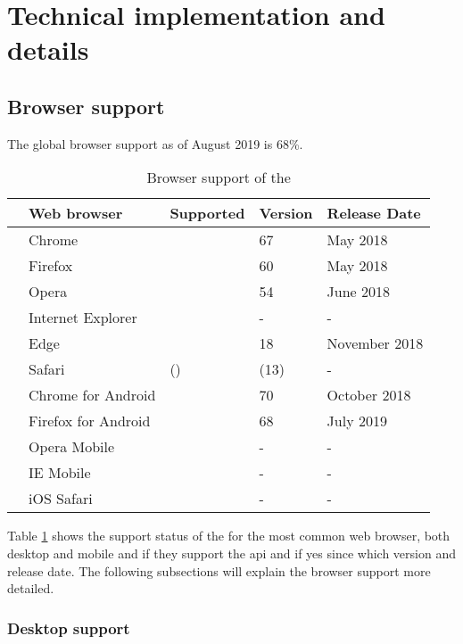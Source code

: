 \section{Technical implementation and details}

\subsection{Browser support}

The global browser support as of August 2019 is 68\%.
\begin{table}[ht]
\renewcommand\thetable{1}
\begin{tabularx}{\textwidth}{l|p{4cm}|p{2.5cm}|p{2cm}|p{3.5cm}}
	& Web browser & Supported & Version & Release Date \\
	\hline
	\parbox[t]{2mm}{} & Chrome & \OK & 67 & May 2018 \\
	& Firefox & \OK & 60 & May 2018 \\
	& Opera & \OK & 54 & June 2018 \\
	& Internet Explorer & \NOOK & - & - \\
	& Edge & \OK & 18 & November 2018 \\
	& Safari & (\OK) & (13) & - \\
	\hline
	\parbox[t]{2mm}{} & Chrome for Android & \OK & 70 & October 2018 \\
	& Firefox for Android & \OK & 68 & July 2019 \\
	& Opera Mobile & \NOOK & - & - \\
	& IE Mobile & \NOOK & - & - \\
	& iOS Safari & \NOOK & - & - \\
	\hline
\end{tabularx}
\caption[Browser support of the \wa{}]{Browser support of the \wa{}\footnotemark} \label{tab:browser-support}
\end{table}

Table \ref{tab:browser-support} shows the support status of the \wa{} for the most common web browser, both desktop and mobile and if they support the \gls{api} and if yes since which version and release date. The following subsections will explain the browser support more detailed.

\subsubsection{Desktop support}


